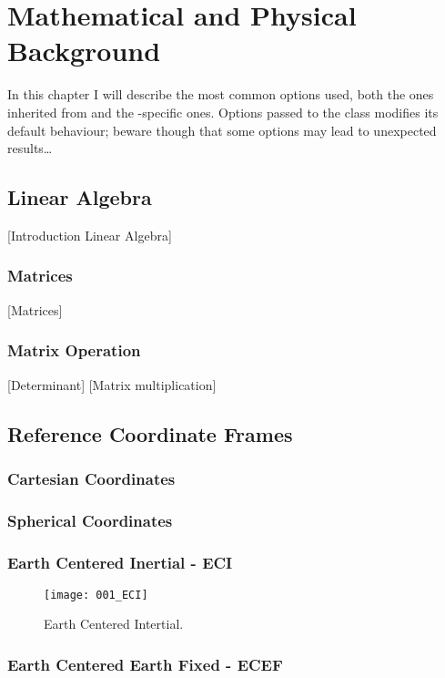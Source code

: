 \setchapterpreamble[u]{\margintoc}
\chapter{Mathematical and Physical Background}

In this chapter I will describe the most common options used, both the 
ones inherited from  and the -specific ones. 
Options passed to the class modifies its default behaviour; beware 
though that some options may lead to unexpected results\ldots

\section{Linear Algebra}

	[Introduction Linear Algebra]
	\subsection{Matrices}
		[Matrices]
	\subsection{Matrix Operation}
		[Determinant]
		[Matrix multiplication]

\section{Reference Coordinate Frames }
\subsection{Cartesian Coordinates}
\subsection{Spherical Coordinates}

\subsection{Earth Centered Inertial - ECI}

\begin{figure}[hb]
	\texttt{[image: 001\_ECI]}
	\caption[Earth Centered Intertial]{Earth Centered Intertial. }
\end{figure}

\subsection{Earth Centered Earth Fixed - ECEF}

